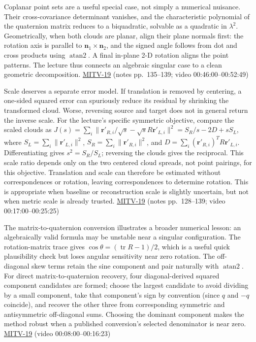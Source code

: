 Coplanar point sets are a useful special case, not simply a numerical nuisance. Their cross-covariance determinant vanishes, and the characteristic polynomial of the quaternion matrix reduces to a biquadratic, solvable as a quadratic in \(\lambda^2\). Geometrically, when both clouds are planar, align their plane normals first: the rotation axis is parallel to \(\mathbf{n}_1\times\mathbf{n}_2\), and the signed angle follows from dot and cross products using \(\operatorname{atan2}\). A final in-plane 2-D rotation aligns the point patterns. The lecture thus connects an algebraic singular case to a clean geometric decomposition. \hyperref[04-visual-computing-ii-ch036]{MITV-19} (notes pp.~135--139; video 00:46:00--00:52:49)

Scale deserves a separate error model. If translation is removed by centering, a one-sided squared error can spuriously reduce its residual by shrinking the transformed cloud. Worse, reversing source and target does not in general return the inverse scale. For the lecture's specific symmetric objective, compare the scaled clouds as \(J(s)=\sum_i\|\mathbf r'_{R,i}/\sqrt{s}-\sqrt{s}R\mathbf r'_{L,i}\|^2=S_R/s-2D+sS_L\), where \(S_L=\sum_i\|\mathbf r'_{L,i}\|^2\), \(S_R=\sum_i\|\mathbf r'_{R,i}\|^2\), and \(D=\sum_i(\mathbf r'_{R,i})^TR\mathbf r'_{L,i}\). Differentiating gives \(s^2=S_R/S_L\); reversing the clouds gives the reciprocal. This scale ratio depends only on the two centered cloud spreads, not point pairings, for this objective. Translation and scale can therefore be estimated without correspondences or rotation, leaving correspondences to determine rotation. This is appropriate when baseline or reconstruction scale is slightly uncertain, but not when metric scale is already trusted. \hyperref[04-visual-computing-ii-ch036]{MITV-19} (notes pp.~128--139; video 00:17:00--00:25:25)

The matrix-to-quaternion conversion illustrates a broader numerical lesson: an algebraically valid formula may be unstable near a singular configuration. The rotation-matrix trace gives \(\cos\theta=(\operatorname{tr}R-1)/2\), which is a useful quick plausibility check but loses angular sensitivity near zero rotation. The off-diagonal skew terms retain the sine component and pair naturally with \(\operatorname{atan2}\). For direct matrix-to-quaternion recovery, four diagonal-derived squared component candidates are formed; choose the largest candidate to avoid dividing by a small component, take that component's sign by convention (since \(q\) and \(-q\) coincide), and recover the other three from corresponding symmetric and antisymmetric off-diagonal sums. Choosing the dominant component makes the method robust when a published conversion's selected denominator is near zero. \hyperref[04-visual-computing-ii-ch036]{MITV-19} (video 00:08:00--00:16:23)

